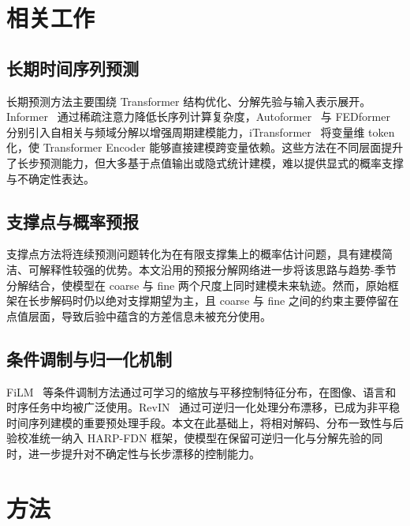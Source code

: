 \documentclass[journal]{IEEEtran}
\begin{document}
\section{相关工作}
\label{sec:related_work}

\subsection{长期时间序列预测}
长期预测方法主要围绕 Transformer 结构优化、分解先验与输入表示展开。Informer~\cite{informer} 通过稀疏注意力降低长序列计算复杂度，Autoformer~\cite{autoformer} 与 FEDformer~\cite{fedformer} 分别引入自相关与频域分解以增强周期建模能力，iTransformer~\cite{itransformer} 将变量维 token 化，使 Transformer Encoder 能够直接建模跨变量依赖。这些方法在不同层面提升了长步预测能力，但大多基于点值输出或隐式统计建模，难以提供显式的概率支撑与不确定性表达。

\subsection{支撑点与概率预报}
支撑点方法将连续预测问题转化为在有限支撑集上的概率估计问题，具有建模简洁、可解释性较强的优势。本文沿用的预报分解网络进一步将该思路与趋势-季节分解结合，使模型在 coarse 与 fine 两个尺度上同时建模未来轨迹。然而，原始框架在长步解码时仍以绝对支撑期望为主，且 coarse 与 fine 之间的约束主要停留在点值层面，导致后验中蕴含的方差信息未被充分使用。

\subsection{条件调制与归一化机制}
FiLM~\cite{film} 等条件调制方法通过可学习的缩放与平移控制特征分布，在图像、语言和时序任务中均被广泛使用。RevIN~\cite{revin} 通过可逆归一化处理分布漂移，已成为非平稳时间序列建模的重要预处理手段。本文在此基础上，将相对解码、分布一致性与后验校准统一纳入 HARP-FDN 框架，使模型在保留可逆归一化与分解先验的同时，进一步提升对不确定性与长步漂移的控制能力。

\section{方法}
\label{sec:method}
\end{document}
